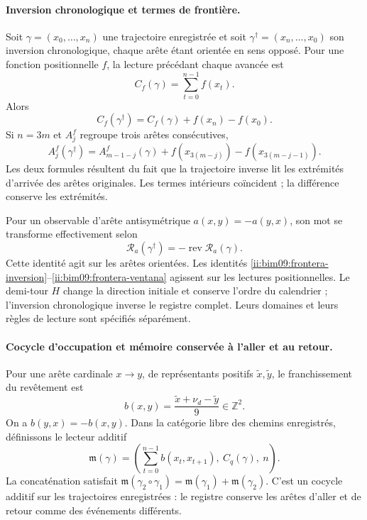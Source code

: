 \paragraph{Inversion chronologique et termes de frontière.}

Soit $\gamma=(x_0,\ldots,x_n)$ une trajectoire enregistrée et soit
$\gamma^\dagger=(x_n,\ldots,x_0)$ son inversion chronologique, chaque
arête étant orientée en sens opposé. Pour une fonction positionnelle $f$,
la lecture précédant chaque avancée est
\[
 C_f(\gamma)=\sum_{t=0}^{n-1}f(x_t).
\]
Alors
\begin{equation}
 C_f(\gamma^\dagger)=C_f(\gamma)+f(x_n)-f(x_0).
 \label{ii:bim09:frontera-inversion}
\end{equation}
Si $n=3m$ et $A_j^f$ regroupe trois arêtes consécutives,
\begin{equation}
 A_j^f(\gamma^\dagger)=A_{m-1-j}^f(\gamma)
 +f(x_{3(m-j)})-f(x_{3(m-j-1)}).
 \label{ii:bim09:frontera-ventana}
\end{equation}
Les deux formules résultent du fait que la trajectoire inverse lit les extrémités
d'arrivée des arêtes originales. Les termes intérieurs coïncident ;
la différence conserve les extrémités.

Pour un observable d'arête antisymétrique $a(x,y)=-a(y,x)$, son mot
se transforme effectivement selon
\[
 \mathcal R_a(\gamma^\dagger)
 =-\operatorname{rev}\mathcal R_a(\gamma).
\]
Cette identité agit sur les arêtes orientées. Les identités
\eqref{ii:bim09:frontera-inversion}--\eqref{ii:bim09:frontera-ventana}
agissent sur les lectures positionnelles. Le demi-tour $H$ change la
direction initiale et conserve l'ordre du calendrier ; l'inversion
chronologique inverse le registre complet. Leurs domaines et leurs règles de
lecture sont spécifiés séparément.

\paragraph{Cocycle d'occupation et mémoire conservée à l'aller et au retour.}

Pour une arête cardinale $x\to y$, de représentants positifs
$\widetilde x,\widetilde y$, le franchissement du revêtement est
\[
 b(x,y)=\frac{\widetilde x+\nu_d-\widetilde y}{9}\in\mathbb Z^2.
\]
On a $b(y,x)=-b(x,y)$. Dans la catégorie libre des chemins
enregistrés, définissons le lecteur additif
\begin{equation}
 \mathfrak m(\gamma)=
 \left(\sum_{t=0}^{n-1}b(x_t,x_{t+1}),\ C_q(\gamma),\ n\right).
 \label{ii:bim09:memoria-aditiva}
\end{equation}
La concaténation satisfait
$\mathfrak m(\gamma_2\circ\gamma_1)=
\mathfrak m(\gamma_1)+\mathfrak m(\gamma_2)$.
C'est un cocycle additif sur les trajectoires enregistrées : le registre conserve
les arêtes d'aller et de retour comme des événements différents.

